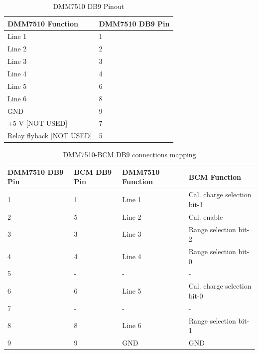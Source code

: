 \documentclass[paper=a4, fontsize=11pt]{scrartcl}
\numberwithin{figure}{section}			%
\numberwithin{table}{section}			%
\begin{document}
\begin{table}
	\center
	\caption{DMM7510 DB9 Pinout}
	\begin{tabular}{m{8cm} m{2cm}}
		\bfseries DMM7510 Function & \bfseries DMM7510 DB9 Pin \\ \hline
		Line 1 & 1 \\ \hline
		Line 2 & 2 \\ \hline
		Line 3 & 3 \\ \hline
		Line 4 & 4 \\ \hline
		Line 5 & 6 \\ \hline
		Line 6 & 8 \\ \hline
		GND & 9 \\ \hline
		+5 V [NOT USED] & 7 \\ \hline
		Relay flyback [NOT USED] & 5 \\ \hline
	\end{tabular}
\end{table}

\begin{table}
	\center
	\caption{DMM7510-BCM DB9 connections mapping}
	\begin{tabular}{m{2cm} m{2cm} m{4cm} m{6cm}}
		\bfseries DMM7510 DB9 Pin & \bfseries BCM DB9 Pin & \bfseries DMM7510 Function & \bfseries BCM Function \\ \hline
		1 & 1 & Line 1 & Cal. charge selection bit-1 \\ \hline
		2 & 5 & Line 2 & Cal. enable \\ \hline
		3 & 3 & Line 3 & Range selection bit-2 \\ \hline
		4 & 4 & Line 4 & Range selection bit-0 \\ \hline
		5 & - & - & - \\ \hline
		6 & 6 & Line 5 & Cal. charge selection bit-0 \\ \hline
		7 & - & - & - \\ \hline
		8 & 8 & Line 6 & Range selection bit-1 \\ \hline
		9 & 9 & GND & GND \\ \hline
	\end{tabular}
\end{table}

\end{document}
